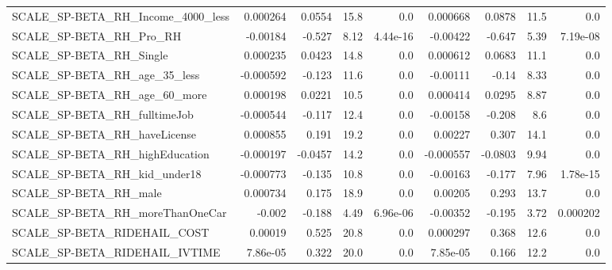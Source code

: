 \begin{tabular}{lrrrrrrrr}
SCALE\_SP-BETA\_RH\_Income\_4000\_less                  &    0.000264 &       0.0554 &      15.8 &      0.0 &   0.000668 &      0.0878 &         11.5 &           0.0 \\
SCALE\_SP-BETA\_RH\_Pro\_RH                            &    -0.00184 &       -0.527 &      8.12 & 4.44e-16 &   -0.00422 &      -0.647 &         5.39 &      7.19e-08 \\
SCALE\_SP-BETA\_RH\_Single                            &    0.000235 &       0.0423 &      14.8 &      0.0 &   0.000612 &      0.0683 &         11.1 &           0.0 \\
SCALE\_SP-BETA\_RH\_age\_35\_less                       &   -0.000592 &       -0.123 &      11.6 &      0.0 &   -0.00111 &       -0.14 &         8.33 &           0.0 \\
SCALE\_SP-BETA\_RH\_age\_60\_more                       &    0.000198 &       0.0221 &      10.5 &      0.0 &   0.000414 &      0.0295 &         8.87 &           0.0 \\
SCALE\_SP-BETA\_RH\_fulltimeJob                       &   -0.000544 &       -0.117 &      12.4 &      0.0 &   -0.00158 &      -0.208 &          8.6 &           0.0 \\
SCALE\_SP-BETA\_RH\_haveLicense                       &    0.000855 &        0.191 &      19.2 &      0.0 &    0.00227 &       0.307 &         14.1 &           0.0 \\
SCALE\_SP-BETA\_RH\_highEducation                     &   -0.000197 &      -0.0457 &      14.2 &      0.0 &  -0.000557 &     -0.0803 &         9.94 &           0.0 \\
SCALE\_SP-BETA\_RH\_kid\_under18                       &   -0.000773 &       -0.135 &      10.8 &      0.0 &   -0.00163 &      -0.177 &         7.96 &      1.78e-15 \\
SCALE\_SP-BETA\_RH\_male                              &    0.000734 &        0.175 &      18.9 &      0.0 &    0.00205 &       0.293 &         13.7 &           0.0 \\
SCALE\_SP-BETA\_RH\_moreThanOneCar                    &      -0.002 &       -0.188 &      4.49 & 6.96e-06 &   -0.00352 &      -0.195 &         3.72 &      0.000202 \\
SCALE\_SP-BETA\_RIDEHAIL\_COST                        &     0.00019 &        0.525 &      20.8 &      0.0 &   0.000297 &       0.368 &         12.6 &           0.0 \\
SCALE\_SP-BETA\_RIDEHAIL\_IVTIME                      &    7.86e-05 &        0.322 &      20.0 &      0.0 &   7.85e-05 &       0.166 &         12.2 &           0.0 \\

\end{tabular}
